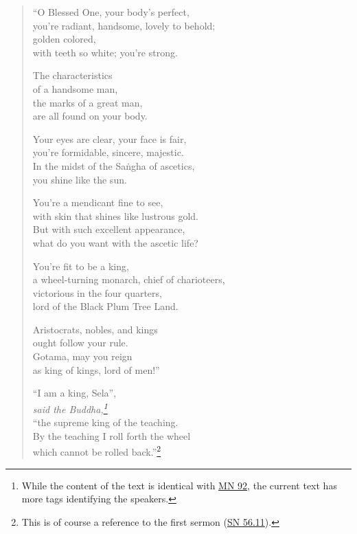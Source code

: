 \documentclass[12pt,openany]{book}%
\newcommand*{\scspeaker}[1]{\hspace{2em}\textit{#1}}
\begin{document}
\begin{verse}%
“O Blessed One, your body’s perfect, \\
you’re radiant, handsome, lovely to behold; \\
golden colored, \\
with teeth so white; you’re strong. 

The characteristics \\
of a handsome man, \\
the marks of a great man, \\
are all found on your body. 

Your eyes are clear, your face is fair, \\
you’re formidable, sincere, majestic. \\
In the midst of the \textsanskrit{Saṅgha} of ascetics, \\
you shine like the sun. 

You’re a mendicant fine to see, \\
with skin that shines like lustrous gold. \\
But with such excellent appearance, \\
what do you want with the ascetic life? 

You’re fit to be a king, \\
a wheel-turning monarch, chief of charioteers, \\
victorious in the four quarters, \\
lord of the Black Plum Tree Land. 

Aristocrats, nobles, and kings \\
ought follow your rule. \\
Gotama, may you reign \\
as king of kings, lord of men!” 

“I am a king, Sela”, \\
\scspeaker{said the Buddha,\footnote{While the content of the text is identical with \href{https://suttacentral.net/mn92/en/sujato}{MN 92}, the current text has more tags identifying the speakers. } }\\
“the supreme king of the teaching. \\
By the teaching I roll forth the wheel \\
which cannot be rolled back.”\footnote{This is of course a reference to the first sermon (\href{https://suttacentral.net/sn56.11/en/sujato}{SN 56.11}). } 


\end{verse}
\end{document}
